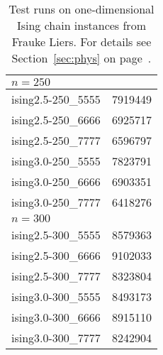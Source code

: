 \documentclass[a4paper, 12pt]{article}
\begin{document}
\begin{table}
\begin{center}
\begin{tabular}{|l|r|}
\hline
\multicolumn{2}{|l|}{$n=250$}\\
\hline
ising2.5-250\_5555 & 7919449 \\
ising2.5-250\_6666 & 6925717 \\
ising2.5-250\_7777 & 6596797 \\
ising3.0-250\_5555 & 7823791 \\
ising3.0-250\_6666 & 6903351 \\
ising3.0-250\_7777 & 6418276 \\
\hline
\multicolumn{2}{|l|}{$n=300$}\\
\hline
ising2.5-300\_5555 & 8579363 \\
ising2.5-300\_6666 & 9102033 \\
ising2.5-300\_7777 & 8323804 \\
ising3.0-300\_5555 & 8493173 \\
ising3.0-300\_6666 & 8915110 \\
ising3.0-300\_7777 & 8242904 \\
\hline
\end{tabular}
\caption{Test runs on one-dimensional Ising chain instances from
  Frauke Liers. For details see Section~\ref{sec:phys} on
  page~\pageref{sec:phys}.} \label{tab:ising} 
\end{center}
\end{table}
\end{document}
